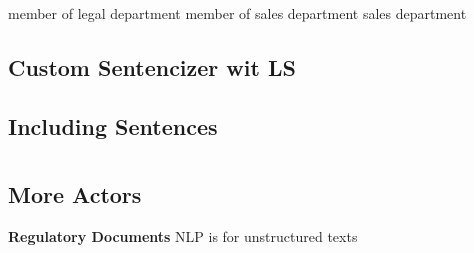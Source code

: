 member of legal department
member of sales department
sales department



\subsection{Custom Sentencizer wit LS}

\subsection{Including Sentences}
\section{}
\subsection{}

\subsection{More Actors}


\textbf{Regulatory Documents}
NLP is for unstructured texts
